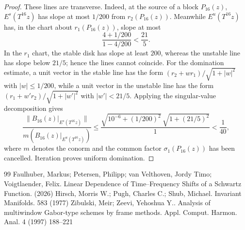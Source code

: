 \documentclass[10pt,a4paper]{amsart}
\numberwithin{equation}{section}
\newcommand{\norm}[1]{\lVert #1\rVert}
\begin{document}
\begin{proof}
These lines are transverse.  Indeed, at the source of a block $P_{16}(z)$,
$E^s(T^{16}z)$ has slope at most $1/200$ from $r_2(P_{16}(z))$.  Meanwhile
$E^u(T^{16}z)$ has, in the chart about $r_1(P_{16}(z))$, slope at most
\[
 \frac{4+1/200}{1-4/200}<\frac{21}{5}.
\]
In the $r_1$ chart, the stable disk has slope at least $200$, whereas the
unstable line has slope below $21/5$; hence the lines cannot coincide.  For
the domination estimate, a unit vector in the stable line has the form
$(r_2+w r_1)/\sqrt{1+|w|^2}$ with $|w|\le1/200$, while a unit vector in the
unstable line has the form $(r_1+w'r_2)/\sqrt{1+|w'|^2}$ with
$|w'|<21/5$.  Applying the singular-value decomposition gives
\[
 \frac{\norm{B_{16}(z)|_{E^s(T^{16}z)}}}
      {m(B_{16}(z)|_{E^u(T^{16}z)})}
 \le
 \frac{\sqrt{10^{-6}+(1/200)^2}\,
       \sqrt{1+(21/5)^2}}{1}
 <\frac1{40},
\]
where $m$ denotes the conorm and the common factor
$\sigma_1(P_{16}(z))$ has been cancelled.  Iteration proves uniform
domination.
\end{proof}

\begin{thebibliography}{99}
 Faulhuber, Markus; Petersen, Philipp; van Velthoven, Jordy Timo; Voigtlaender, Felix. Linear Dependence of Time--Frequency Shifts of a {Schwartz} Function. (2026)
 Hirsch, Morris W.; Pugh, Charles C.; Shub, Michael. Invariant Manifolds. 583 (1977)
 Zibulski, Meir; Zeevi, Yehoshua Y.. Analysis of multiwindow {Gabor}-type schemes by frame methods. Appl. Comput. Harmon. Anal. 4 (1997) 188--221
\end{thebibliography}
\end{document}
